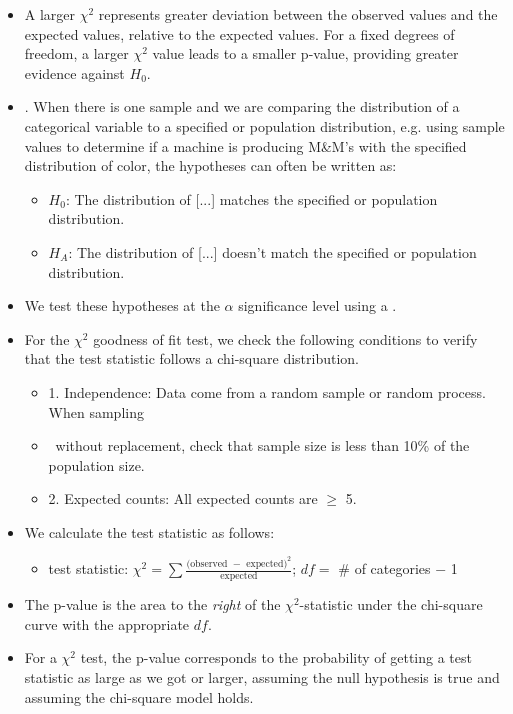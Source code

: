 \begin{itemize}
\item A larger $\chi^2$ represents greater deviation between the observed values and the expected values, relative to the expected values.  For a fixed degrees of freedom, a larger $\chi^2$ value leads to a smaller p-value, providing greater evidence against $H_0$. 


\item {}.  When there is one sample and we are comparing the distribution of a categorical variable to a specified or population distribution, e.g. using sample values to determine if a machine is producing M\&M's with the specified distribution of color, the hypotheses can often be written as:
\begin{itemize}
\item[] $H_0$: The distribution of [...] matches the specified or population distribution. 
\item[] $H_A$: The distribution of [...] doesn't match the specified or population distribution. 
\end{itemize}

\item[] We test these hypotheses at the $\alpha$ significance level using a .\\
\item For the $\chi^2$ goodness of fit test, we check the following conditions to verify that the test statistic follows a chi-square distribution.  
\begin{itemize}
\item[] 1.  Independence:  Data come from a random sample or random process.  When sampling 
\item[] \quad \ without replacement, check that sample size is less than 10\% of the population size.
\item[] 2.  Expected counts:  All expected counts are $\ge$ 5.
\end{itemize}

\D{\newpage}

\item We calculate the test statistic as follows:
\begin{itemize}
\item[] test statistic:  $\chi^2 =\sum{ \frac{\text{(observed } - \text{ expected})^2}{\text{expected}}}$; \quad \quad $df =$ \# of categories $-$ 1
\end{itemize}
\item The p-value is the area to the \emph{right} of the $\chi^2$-statistic under the chi-square curve with the appropriate $df$.

\item For a $\chi^2$ test, the p-value corresponds to the probability of getting a test statistic as large as we got or larger, assuming the null hypothesis is true and assuming the chi-square model holds.
\end{itemize}


